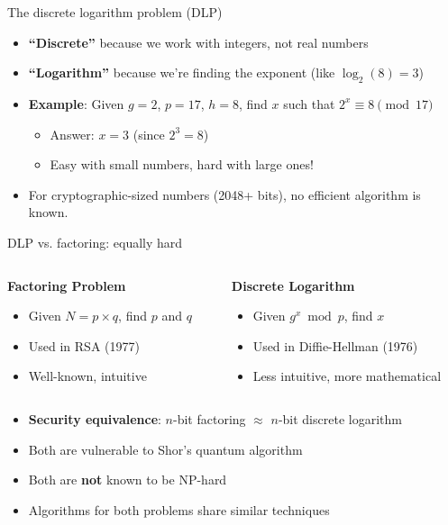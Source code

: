 \documentclass[aspectratio=169, lualatex, handout]{beamer}
\begin{document}
\begin{frame}{The discrete logarithm problem (DLP)}
	\begin{itemize}[<+->]
		\item \textbf{``Discrete''} because we work with integers, not real numbers
		\item \textbf{``Logarithm''} because we're finding the exponent (like $\log_2(8) = 3$)
		\item \textbf{Example}: Given $g = 2$, $p = 17$, $h = 8$, find $x$ such that $2^x \equiv 8 \pmod{17}$
		      \begin{itemize}
			      \item Answer: $x = 3$ (since $2^3 = 8$)
			      \item Easy with small numbers, hard with large ones!
		      \end{itemize}
		\item For cryptographic-sized numbers (2048+ bits), no efficient algorithm is known.
	\end{itemize}
\end{frame}

\begin{frame}{DLP vs. factoring: equally hard}
	\begin{columns}[c]
		\begin{column}{0.5\textwidth}
			\textbf{Factoring Problem}
			\begin{itemize}[<+->]
				\item Given $N = p \times q$, find $p$ and $q$
				\item Used in RSA (1977)
				\item Well-known, intuitive
			\end{itemize}
		\end{column}
		\begin{column}{0.5\textwidth}
			\textbf{Discrete Logarithm}
			\begin{itemize}[<+->]
				\item Given $g^x \bmod p$, find $x$
				\item Used in Diffie-Hellman (1976)
				\item Less intuitive, more mathematical
			\end{itemize}
		\end{column}
	\end{columns}
	\vspace{1cm}
	\begin{itemize}[<+->]
		\item \textbf{Security equivalence}: $n$-bit factoring $\approx$ $n$-bit discrete logarithm
		\item Both are vulnerable to Shor's quantum algorithm
		\item Both are \textbf{not} known to be NP-hard
		\item Algorithms for both problems share similar techniques
	\end{itemize}
\end{frame}
\end{document}

